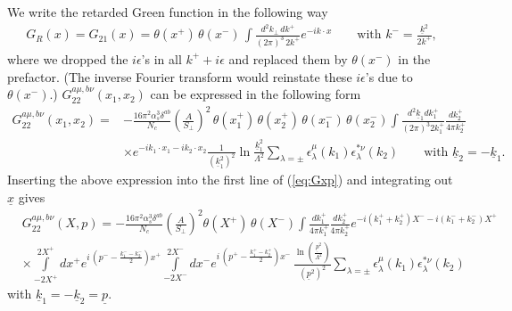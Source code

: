 \documentclass[onecolumn,showpacs,nobibnotes,nofootinbib,12pt,aps,prd,showpacs,notitlepage,nofootinbib,preprintnumbers,amsmath,amssymb]{article}
\newcommand{\un}[1]{\underline{#1}}
\begin{document}
We write the retarded Green function in the following way
\begin{align}
  G_R(x) = G_{21} (x) = \theta(x^+) \, \theta(x^-) \, \int \frac{d^2 k_\perp \, d
    k^+}{(2\pi)^3 \, 2k^+} e^{-ik\cdot x}\qquad\text{with
    $k^-=\frac{\underline{k}^2}{2 k^+}$},\label{eq:GRk2}
\end{align}
where we dropped the $i \epsilon$'s in all $k^+ + i \epsilon$ and
replaced them by $\theta(x^-)$ in the prefactor. (The inverse Fourier
transform would reinstate these $i \epsilon$'s due to $\theta(x^-)$.)
$G_{22}^{a\mu,b\nu}(x_1,x_2)$ can be expressed in the following form
\begin{align}
  G_{22}^{a\mu,b\nu}(x_1, x_2)=&-\frac{16\pi^2\alpha_s^3\delta^{ab}}{N_c}\left(\frac{A}{S_\perp}\right)^2 \, \theta(x_1^+) \, \theta(x_2^+) \, \theta(x_1^-) \, \theta(x_2^-) \int \frac{d^2\underline{k}_1 dk_1^+}{(2\pi)^3 2k_1^+}  \frac{dk_2^+}{4\pi k_2^+} \nonumber \\
  &\times e^{-i k_1\cdot x_1-i k_2\cdot x_2}
  \frac{1}{(\underline{k}_{1}^2)^2}\ln\frac{\underline{k}_1^2}{\Lambda^2}\sum\limits_{\lambda=\pm}\epsilon_\lambda^\mu(k_1)
  \epsilon_{\lambda}^{*\nu}(k_2)\qquad\text{with
  }\underline{k}_2=-\underline{k}_1.
\end{align}
Inserting the above expression into the first line of (\ref{eq:Gxp})
and integrating out $\un{x}$ gives
\begin{align}
  &G_{22}^{a\mu,b\nu}(X, p)=-\frac{16\pi^2\alpha_s^3\delta^{ab}}{N_c}\left(\frac{A}{S_\perp}\right)^2 \theta(X^+) \, \theta(X^-) \int \frac{dk_1^+}{4\pi k_1^+}  \frac{dk_2^+}{4\pi k_2^+} e^{-i (k_1^+ + k_2^+) X^- -i (k_1^- + k_2^-) X^+}\nonumber\\
  &\times 
  \int\limits_{-2 X^+}^{2 X^+} d x^+ e^{i \,
    \left(p^--\frac{k_1^--k_2^-}{2}\right) x^+ } \int\limits_{-2
    X^-}^{2 X^-} d x^- e^{i \, \left(p^+ -
      \frac{k_1^+-k_2^+}{2}\right) x^-} \,
  \frac{\ln\left(\frac{\underline{p}^2}{\Lambda^2}\right)}{(\underline{p}^2)^2}
  \sum\limits_{\lambda=\pm}\epsilon_\lambda^\mu(k_1)
  \epsilon_{\lambda}^{*\nu}(k_2)
\end{align}
with $\underline{k}_1=-\underline{k}_2=\underline{p}$.
\end{document}
